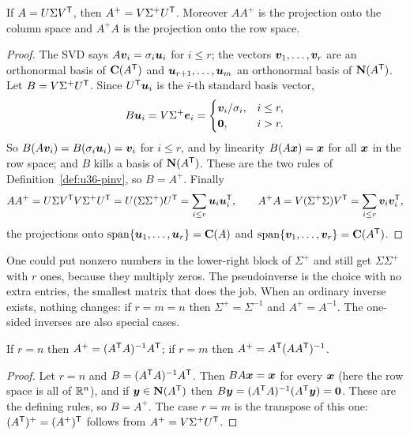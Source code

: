 \begin{theorem}\label{thm:u36-svd}
If $A=U\Sigma V^{\mathsf{T}}$, then $A^{+}=V\Sigma^{+}U^{\mathsf{T}}$. Moreover $AA^{+}$ is the projection onto the column space and $A^{+}A$ is the projection onto the row space.
\end{theorem}
\begin{proof}
The SVD says $A\boldsymbol{v}_i=\sigma_i\boldsymbol{u}_i$ for $i\le r$; the vectors $\boldsymbol{v}_1,\dots,\boldsymbol{v}_r$ are an orthonormal basis of $\mathbf{C}(A^{\mathsf{T}})$ and $\boldsymbol{u}_{r+1},\dots,\boldsymbol{u}_m$ an orthonormal basis of $\mathbf{N}(A^{\mathsf{T}})$. Let $B=V\Sigma^{+}U^{\mathsf{T}}$. Since $U^{\mathsf{T}}\boldsymbol{u}_i$ is the $i$-th standard basis vector,
\[
B\boldsymbol{u}_i=V\Sigma^{+}\boldsymbol{e}_i=\begin{cases}\boldsymbol{v}_i/\sigma_i,& i\le r,\\ \boldsymbol{0},& i>r.\end{cases}
\]
So $B(A\boldsymbol{v}_i)=B(\sigma_i\boldsymbol{u}_i)=\boldsymbol{v}_i$ for $i\le r$, and by linearity $B(A\boldsymbol{x})=\boldsymbol{x}$ for all $\boldsymbol{x}$ in the row space; and $B$ kills a basis of $\mathbf{N}(A^{\mathsf{T}})$. These are the two rules of Definition~\ref{def:u36-pinv}, so $B=A^{+}$. Finally
\[
AA^{+}=U\Sigma V^{\mathsf{T}} V\Sigma^{+}U^{\mathsf{T}}=U(\Sigma\Sigma^{+})U^{\mathsf{T}}=\sum_{i\le r}\boldsymbol{u}_i\boldsymbol{u}_i^{\mathsf{T}},\qquad A^{+}A=V(\Sigma^{+}\Sigma)V^{\mathsf{T}}=\sum_{i\le r}\boldsymbol{v}_i\boldsymbol{v}_i^{\mathsf{T}},
\]
the projections onto $\operatorname{span}\{\boldsymbol{u}_1,\dots,\boldsymbol{u}_r\}=\mathbf{C}(A)$ and $\operatorname{span}\{\boldsymbol{v}_1,\dots,\boldsymbol{v}_r\}=\mathbf{C}(A^{\mathsf{T}})$.
\end{proof}

One could put nonzero numbers in the lower-right block of $\Sigma^{+}$ and still get $\Sigma\Sigma^{+}$ with $r$ ones, because they multiply zeros. The pseudoinverse is the choice with no extra entries, the smallest matrix that does the job. When an ordinary inverse exists, nothing changes: if $r=m=n$ then $\Sigma^{+}=\Sigma^{-1}$ and $A^{+}=A^{-1}$. The one-sided inverses are also special cases.

\begin{proposition}\label{prop:u36-consistent}
If $r=n$ then $A^{+}=(A^{\mathsf{T}} A)^{-1}A^{\mathsf{T}}$; if $r=m$ then $A^{+}=A^{\mathsf{T}}(AA^{\mathsf{T}})^{-1}$.
\end{proposition}
\begin{proof}
Let $r=n$ and $B=(A^{\mathsf{T}} A)^{-1}A^{\mathsf{T}}$. Then $BA\boldsymbol{x}=\boldsymbol{x}$ for every $\boldsymbol{x}$ (here the row space is all of $\mathbb{R}^n$), and if $\boldsymbol{y}\in\mathbf{N}(A^{\mathsf{T}})$ then $B\boldsymbol{y}=(A^{\mathsf{T}} A)^{-1}(A^{\mathsf{T}}\boldsymbol{y})=\boldsymbol{0}$. These are the defining rules, so $B=A^{+}$. The case $r=m$ is the transpose of this one: $(A^{\mathsf{T}})^{+}=(A^{+})^{\mathsf{T}}$ follows from $A^{+}=V\Sigma^{+}U^{\mathsf{T}}$.
\end{proof}

